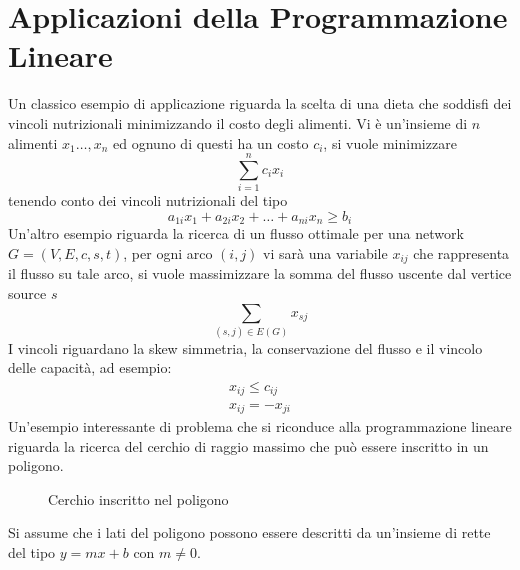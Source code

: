 \documentclass[10pt, letterpaper]{report}
\begin{document}
\section{Applicazioni della Programmazione Lineare}
Un classico esempio di applicazione riguarda la scelta di una dieta che soddisfi dei vincoli nutrizionali minimizzando il costo degli alimenti. Vi è un'insieme di $n$ alimenti $x_1\dots,x_n$ ed ognuno di questi ha un costo $c_i$, si vuole minimizzare 
$$\sum_{i=1}^nc_ix_i $$
tenendo conto dei vincoli nutrizionali del tipo 
$$ a_{1i}x_1+a_{2i}x_2+\dots + a_{ni}x_n\ge b_i$$
Un'altro esempio riguarda la ricerca di un flusso ottimale per una network $G=(V,E,c,s,t)$, per ogni arco $(i,j)$ vi sarà una variabile $x_{ij}$ che rappresenta il flusso su tale arco, si vuole massimizzare la somma del flusso uscente dal vertice source  $s$
$$ \sum_{(s,j)\in E(G)}x_{sj}$$
I vincoli riguardano la skew simmetria, la conservazione del flusso e il vincolo delle capacità, ad esempio:
$$ \begin{matrix}
    x_{ij}\le c_{ij} \\ 
    x_{ij}=-x_{ji}
\end{matrix}$$
Un'esempio interessante di problema che si riconduce alla programmazione lineare riguarda la ricerca del cerchio di raggio massimo che può essere inscritto in un poligono.
\begin{figure}[h]
    \caption{Cerchio inscritto nel poligono}
\end{figure}
Si assume che i lati del poligono possono essere descritti da un'insieme di rette del tipo $y=mx+b$ con $m\ne 0$.\bigskip 
\end{document}

